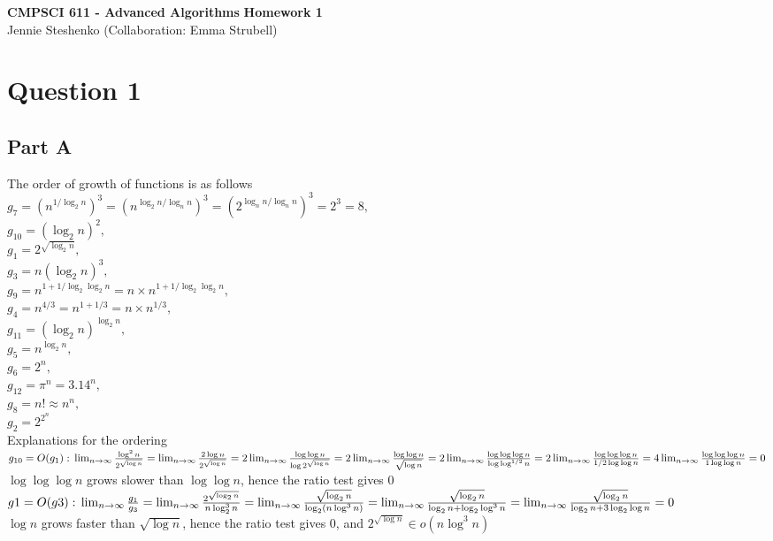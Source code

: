\documentclass{article}
\begin{document}
\begin{center} \LARGE\textbf{CMPSCI 611 - Advanced Algorithms}
\Large\textbf{Homework 1}
\vspace{0.5cm}\\Jennie Steshenko \small{(Collaboration: Emma Strubell)}
\end{center}

\section*{Question 1}
\subsection*{Part A}
The order of growth of functions is as follows\\ 
$ g_7 = (n^{1/\log_2 n})^3 = (n^{{\log_2 n}/{\log_n n}})^3 = (2^{{\log_n
n}/{\log_n n}})^3 = 2^3 = 8,$\\
$g_{10} = (\log_2 n)^2,$\\
$g_1 = 2^{\sqrt{\log_2 n}},$\\
$g_3 = n(\log_2 n)^3,$\\
$g_9 = n^{1+1/\log_2 \log_2 n} = n \times {n^{1+1/\log_2 \log_2 n}},$\\ 
$g_4 = n^{4/3} = n^{1+1/3} = n \times n^{1/3},$\\
$g_{11} = (\log_2 n)^{\log_2 n},$\\
$g_5 = n^{\log_2 n},$\\
$g_6 = 2^n,$\\
$g_{12} = \pi^n = 3.14^n,$\\
$g_8 = n! \approx{n^n},$\\
$g_2 = 2^{2^n}$\\

Explanations for the ordering\\

$g_{10} = O(g_1):\\
\lim_{n\to\infty}\frac{\log^2n}{2^{\sqrt{\log n}}} =
\lim_{n\to\infty}\frac{2\log n}{2^{\sqrt{\log n}}} =
2\lim_{n\to\infty}\frac{\log\log n}{\log2^{\sqrt{\log n}}} = 
2\lim_{n\to\infty}\frac{\log\log n}{\sqrt{\log n}} =  
2\lim_{n\to\infty}\frac{\log\log\log n}{\log\log^{1/2}n} =
2\lim_{n\to\infty}\frac{\log\log\log n}{1/2\log\log n} = 
4\lim_{n\to\infty}\frac{\log\log\log n}{1\log\log n} = 0$\\
$\log\log\log n$ grows slower than $\log\log n$, hence the ratio test gives 0\\

$g1 = O(g3):\\
\lim_{n\to\infty}\frac{g_1}{g_3} = \lim_{n\to\infty}\frac{2^{\sqrt{\log_2
n}}}{n\log_2^3n} = \lim_{n\to\infty}\frac{\sqrt{\log_2 n}}{\log_2 (n\log^3n)}
= \lim_{n\to\infty}\frac{\sqrt{\log_2 n}}{\log_2 n + \log_2\log^3n} = 
\lim_{n\to\infty}\frac{\sqrt{\log_2 n}}{\log_2 n + 3\log_2\log n} = 0$\\
$\log n$ grows faster than $\sqrt{\log n}$, hence the ratio test
gives 0, and $2^{\sqrt{\log n}} \in o(n\log^3n)$\\
\end{document}
